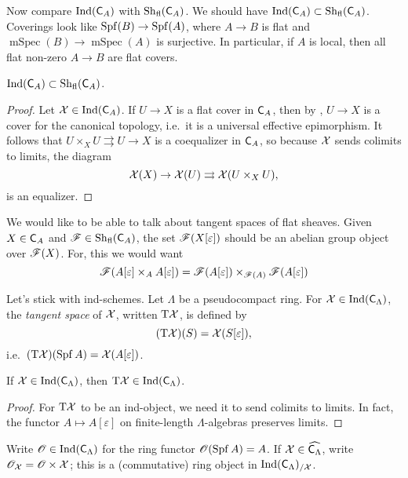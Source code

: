 \documentclass[phd,cornellheadings,draft]{cornell}
\begin{document}
Now compare $\operatorname{Ind}(\mathsf{C}_A)$ with $\operatorname{Sh}_\mathrm{fl}(\mathsf{C}_A)$. 
We should have $\operatorname{Ind}(\mathsf{C}_A)\subset \operatorname{Sh}_\mathrm{fl}(\mathsf{C}_A)$. 
Coverings look like $\operatorname{Spf}(B)\to \operatorname{Spf}(A)$, where $A\to B$ is flat and 
$\operatorname{mSpec}(B)\to \operatorname{mSpec}(A)$ is surjective. In particular, if 
$A$ is local, then all flat non-zero $A\to B$ are flat covers. 


\begin{theorem}
$\operatorname{Ind}(\mathsf{C}_A)\subset \operatorname{Sh}_\mathrm{fl}(\mathsf{C}_A)$. 
\end{theorem}
\begin{proof}
Let $\mathcal{X}\in \operatorname{Ind}(\mathsf{C}_A)$. If $U\to X$ is a flat 
cover in $\mathsf{C}_A$, then by \cite[IV 6.3.1(iii)]{sga3-i}, $U\to X$ is a 
cover for the canonical topology, i.e.~it is a universal effective epimorphism. 
It follows that $U\times_X U\rightrightarrows U \to X$ is a coequalizer in 
$\mathsf{C}_A$, so because $\mathcal{X}$ sends colimits to limits, the diagram  
\[
  \mathcal{X}(X) \to \mathcal{X}(U) \rightrightarrows \mathcal{X}(U\times_X U) ,
\]
is an equalizer. 
\end{proof}

We would like to be able to talk about tangent spaces of flat sheaves. Given 
$X\in \mathsf{C}_A$ and $\mathscr F\in \operatorname{Sh}_\mathrm{fl}(\mathsf{C}_A)$, 
the set $\mathscr{F}(X[\varepsilon])$ should be an abelian group object over 
$\mathscr{F}(X)$. For, this we would want 
\[
  \mathscr{F}(A[\varepsilon]\times_A A[\varepsilon]) = \mathscr{F}(A[\varepsilon])\times_{\mathscr{F}(A)} \mathscr{F}(A[\varepsilon])
\]

Let's stick with ind-schemes. Let $\Lambda$ be a pseudocompact ring. For 
$\mathcal{X}\in \operatorname{Ind}(\mathsf{C}_\Lambda)$, the \emph{tangent space} of $\mathcal{X}$, 
written $\mathrm{T}\mathcal{X}$, is defined by 
\[
  (\mathrm{T}\mathcal{X})(S) = \mathcal{X}(S[\varepsilon]), 
\]
i.e.~$(\mathrm{T}\mathcal{X})(\operatorname{Spf} A) = \mathcal{X}(A[\varepsilon])$. 

\begin{theorem}
If $\mathcal{X}\in \operatorname{Ind}(\mathsf{C}_\Lambda)$, then 
$\mathrm{T}\mathcal{X}\in \operatorname{Ind}(\mathsf{C}_\Lambda)$. 
\end{theorem}
\begin{proof}
For $\mathrm{T}\mathcal{X}$ 
to be an ind-object, we need it to send colimits to limits. In fact, the 
functor $A\mapsto A[\varepsilon]$ on finite-length $\Lambda$-algebras preserves 
limits.
\end{proof}

Write $\mathscr{O}\in \operatorname{Ind}(\mathsf{C}_\Lambda)$ for the ring functor 
$\mathscr{O}(\operatorname{Spf} A) = A$. If $\mathcal{X}\in \widehat{\mathsf{C}_\Lambda}$, write 
$\mathscr{O}_{\mathcal{X}} = \mathscr{O}\times \mathcal{X}$; this is a (commutative) ring object in 
$\operatorname{Ind}(\mathsf{C}_\Lambda)_{/\mathcal{X}}$. 
\end{document}
